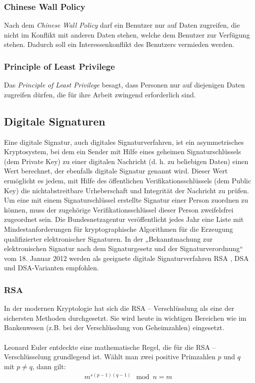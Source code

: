 \subsubsection*{Chinese Wall Policy}
Nach dem \textit{Chinese Wall Policy} darf ein Benutzer nur auf Daten zugreifen, die nicht im Konflikt mit anderen Daten stehen, welche dem Benutzer zur Verfügung stehen. Dadurch soll ein Interessenkonflikt des Benutzers vermieden werden. 
\subsubsection*{Principle of Least Privilege}
Das \textit{Principle of Least Privilege} besagt, dass Personen nur auf diejenigen Daten zugreifen dürfen, die für ihre Arbeit zwingend erforderlich sind.
\subsection{Digitale Signaturen}
Eine digitale Signatur, auch digitales Signaturverfahren, ist ein asymmetrisches Kryptosystem, bei dem ein Sender mit Hilfe eines geheimen Signaturschlüssels (dem Private Key) zu einer digitalen Nachricht (d. h. zu beliebigen Daten) einen Wert berechnet, der ebenfalls digitale Signatur genannt wird. Dieser Wert ermöglicht es jedem, mit Hilfe des öffentlichen Verifikationsschlüssels (dem Public Key) die nichtabstreitbare Urheberschaft und Integrität der Nachricht zu prüfen. Um eine mit einem Signaturschlüssel erstellte Signatur einer Person zuordnen zu können, muss der zugehörige Verifikationsschlüssel dieser Person zweifelsfrei zugeordnet sein.
Die Bundesnetzagentur veröffentlicht jedes Jahr eine Liste mit Mindestanforderungen für kryptographische Algorithmen für die Erzeugung qualifizierter elektronischer Signaturen. In der „Bekanntmachung zur elektronischen Signatur nach dem Signaturgesetz und der Signaturverordnung“ vom 18. Januar 2012 werden als geeignete digitale Signaturverfahren RSA , DSA und DSA-Varianten empfohlen. 
\subsubsection{RSA}
In der modernen Kryptologie hat sich die RSA  – Verschlüsslung als eine der
sichersten Methoden durchgesetzt. Sie wird heute in wichtigen Bereichen wie  im
Bankenwesen (z.B. bei der Verschlüsslung von Geheimzahlen) eingesetzt.
\\\\
Leonard Euler entdeckte eine mathematische Regel, die für die RSA –
Verschlüsselung grundlegend ist. Wählt man zwei positive Primzahlen $p$ und $q$ mit $p \neq q$, dann gilt:
\begin{equation}
	\begin{split}
		m^{s(p-1)(q-1)}\mod n = m
 	\end{split}
\end{equation}

